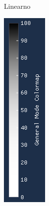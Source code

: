 \documentclass[times, utf8, diplomski]{fer}
\begin{document}
\begin{figure} [H]
\begin{subfigure}[h]{0.17\textwidth}
         \caption{Linearno}
         \label{fig:linear_legend}
     \end{subfigure}
     \hfill
     \begin{subfigure}[h]{0.17\textwidth}
         \centering
         \includegraphics[width=\textwidth]{cubic_colormap.png}

\end{subfigure}
\end{figure}
\end{document}
